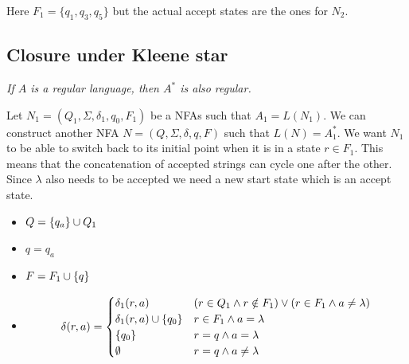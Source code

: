 \documentclass{article}
\newcommand{\emptyString}{\lambda}
\begin{document}
\begin{center}
\end{center}
Here \(F_1 = \{q_1, q_3, q_5\}\) but the actual accept states are the ones for \(N_2\).

\subsection{Closure under Kleene star}

\textit{If \(A\) is a regular language, then \(A^*\) is also regular.}

Let \(N_1 = (Q_1, \Sigma, \delta_1, q_0, F_1)\) be a NFAs such that
\(A_1 = L(N_1)\). We can construct another NFA \(N=(Q, \Sigma, \delta, q, F)\)
such that \(L(N)=A_1^*\).
We want \(N_1\) to be able to switch back to its initial point
when it is in a state \(r \in F_1\). This means that the concatenation of
accepted strings can cycle one after the other. Since \(\emptyString\)
also needs to be accepted we need a new start state which is an accept state.

\begin{itemize}
    \item \(Q = \{q_a\} \cup Q_1\)
    \item \(q = q_a\)
    \item \(F = F_1 \cup \{q\}\)
    \item \[
        \delta(r,a) =
        \begin{cases}
            \delta_1(r,a) & (r \in Q_1 \land r \notin F_1) \lor (r \in F_1 \land a \neq \emptyString) \\
            \delta_1(r,a) \union \{q_0\} & r \in F_1 \land a = \emptyString \\
            \{q_0\} & r = q \land a = \emptyString \\
            \emptyset & r = q \land a \neq \emptyString
        \end{cases}
    \]
\end{itemize}
\end{document}
